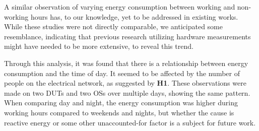 A similar observation of varying energy consumption between working and non-working hours has, to our knowledge, yet to be addressed in existing works\cite{georgiou2020energy,Koedijk2022diff, khan2018rapl}. While these studies were not directly comparable, we anticipated some resemblance, indicating that previous research utilizing hardware measurements might have needed to be more extensive, to reveal this trend.

Through this analysis, it was found that there is a relationship between energy consumption and the time of day. It seemed to be affected by the number of people on the electrical network, as suggested by \textbf{H1}. These observations were made on two DUTs and two OSs over multiple days, showing the same pattern. When comparing day and night, the energy consumption was higher during working hours compared to weekends and nights, but whether the cause is reactive energy or some other unaccounted-for factor is a subject for future work.










